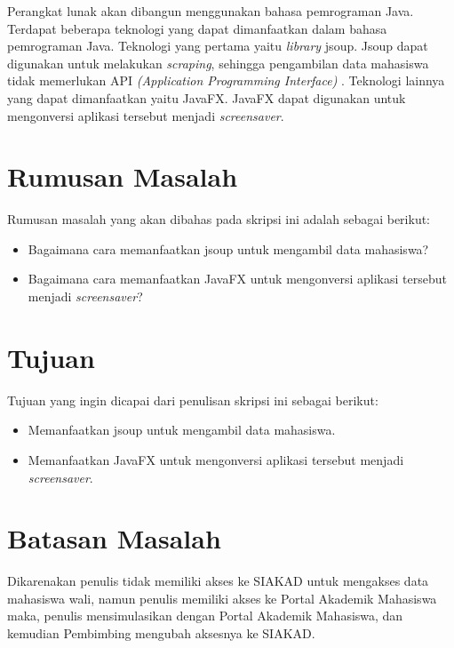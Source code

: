 Perangkat lunak akan dibangun menggunakan bahasa pemrograman Java. Terdapat beberapa teknologi yang dapat dimanfaatkan dalam bahasa pemrograman Java. Teknologi yang pertama yaitu \textit{library} jsoup. Jsoup dapat digunakan untuk melakukan \textit{scraping}, sehingga pengambilan data mahasiswa tidak memerlukan API \textit{(Application Programming Interface)} \cite{jsoup}. Teknologi lainnya yang dapat dimanfaatkan yaitu JavaFX. JavaFX dapat digunakan untuk mengonversi aplikasi tersebut menjadi \textit{screensaver}.



\section{Rumusan Masalah}
\label{sec:rumusan}
Rumusan masalah yang akan dibahas pada skripsi ini adalah sebagai berikut:
\begin{itemize}
	\item Bagaimana cara memanfaatkan jsoup untuk mengambil data mahasiswa?
	\item Bagaimana cara memanfaatkan JavaFX untuk mengonversi aplikasi tersebut menjadi \textit{screensaver}?
\end{itemize}   

\section{Tujuan}
\label{sec:tujuan}
Tujuan yang ingin dicapai dari penulisan skripsi ini sebagai berikut:
\begin{itemize}
    \item Memanfaatkan jsoup untuk mengambil data mahasiswa.
    \item Memanfaatkan JavaFX untuk mengonversi aplikasi tersebut menjadi \textit{screensaver}.
\end{itemize}

\section{Batasan Masalah}
\label{sec:batasan}
Dikarenakan penulis tidak memiliki akses ke SIAKAD untuk mengakses data mahasiswa wali, namun penulis memiliki akses ke Portal Akademik Mahasiswa maka, penulis mensimulasikan dengan Portal Akademik Mahasiswa, dan kemudian Pembimbing mengubah aksesnya ke SIAKAD. 

